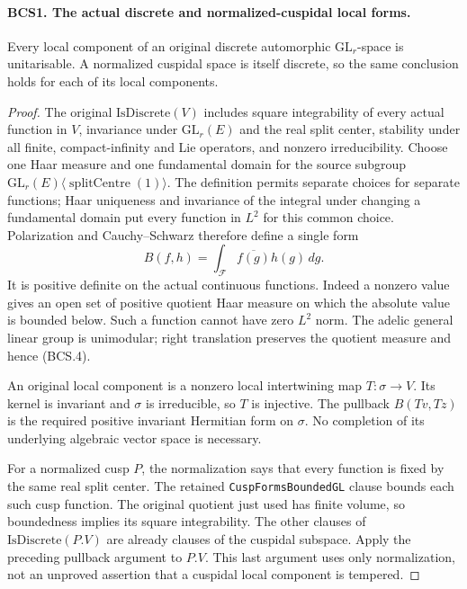 \paragraph{BCS1. The actual discrete and normalized-cuspidal local forms.}
\label{claim:BCS1}
Every local component of an original discrete automorphic
\(\mathrm{GL}_r\)-space is unitarisable.  A normalized cuspidal
space is itself discrete, so the same conclusion holds for each of
its local components.
\begin{proof}
The original \(\mathrm{IsDiscrete}(V)\) includes square
integrability of every actual function in \(V\), invariance under
\(\mathrm{GL}_r(E)\) and the real split center, stability under all
finite, compact-infinity and Lie operators, and nonzero irreducibility.
Choose one Haar measure and one fundamental domain for the source
subgroup
\(\mathrm{GL}_r(E)\langle\operatorname{splitCentre}(1)\rangle\).
The definition permits separate choices for separate functions; Haar
uniqueness and invariance of the integral under changing a fundamental
domain put every function in \(L^2\) for this common choice.  Polarization
and Cauchy--Schwarz therefore define a single form
\[
 B(f,h)=\int_{\mathcal F}\overline{f(g)}h(g)\,dg.
 \tag{BCS.4}
\]
It is positive definite on the actual continuous functions.  Indeed a
nonzero value gives an open set of positive quotient Haar measure on
which the absolute value is bounded below.  Such a function cannot have
zero \(L^2\) norm.  The adelic general linear group is unimodular;
right translation preserves the quotient measure and hence (BCS.4).

An original local component is a nonzero local intertwining map
\(T:\sigma\to V\).  Its kernel is invariant and \(\sigma\) is
irreducible, so \(T\) is injective.  The pullback \(B(Tv,Tz)\) is
the required positive invariant Hermitian form on \(\sigma\).
No completion of its underlying algebraic vector space is necessary.

For a normalized cusp \(P\), the normalization says that every
function is fixed by the same real split center.  The retained
\texttt{CuspFormsBoundedGL} clause bounds each such cusp function.
The original quotient just used has finite volume, so boundedness
implies its square integrability.  The other clauses of
\(\mathrm{IsDiscrete}(P.V)\) are already clauses of the cuspidal
subspace.  Apply the preceding pullback argument to \(P.V\).
This last argument uses only normalization, not an unproved assertion
that a cuspidal local component is tempered.
\end{proof}

